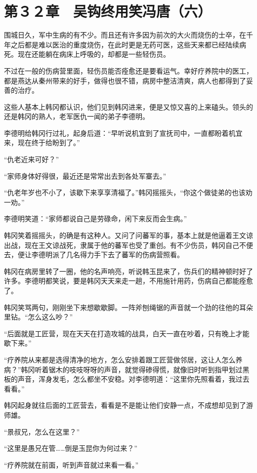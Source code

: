 \section{第３２章　吴钩终用笑冯唐（六）}

围城日久，军中生病的有不少。而且还有许多因为前次的大火而烧伤的士卒，在千年之后都是难以医治的重度烧伤，在此时更是无药可医，这些天来都已经陆续病死。现在还能躺在病床上呼吸的，却都是一些轻伤员。

不过在一般的伤病营里面，轻伤员能否痊愈还是要看运气。幸好疗养院中的医工，都是燕达从秦州带来的好手，做得也很不错，病房中整洁清爽，病人也都得到了妥善的治疗。

这些人基本上韩冈都认识，他们见到韩冈进来，便是又惊又喜的上来磕头。领头的还是韩冈的熟人，老军医仇一闻的弟子李德明。

李德明给韩冈行过礼，起身后道：“早听说机宜到了宣抚司中，一直都盼着机宜来，现在终于给盼到了。”

“仇老近来可好？”

“家师身体好得很，最近还是常常出去到各处军寨去。”

“仇老年岁也不小了，该歇下来享享清福了。”韩冈摇摇头，“你这个做徒弟的也该劝一劝。”

李德明笑道：“家师都说自己是劳碌命，闲下来反而会生病。”

韩冈笑着摇摇头，的确是有这种人。又问了问蕃军的事，基本上就是他逼着王文谅出战，现在王文谅战死，隶属于他的蕃军也受了重创。有不少伤员，韩冈自己不便去，便让李德明派了几名得力手下去了蕃军的伤病营照看。

韩冈在病房里转了一圈，他的名声响亮，听说韩玉昆来了，伤兵们的精神顿时好了许多。李德明都笑说，要是韩冈天天来走一趟，不用施针用药，伤病自己都能痊愈了。

韩冈笑骂两句，刚刚坐下来想歇歇脚。一阵斧刨绳锯的声音就一个劲的往他的耳朵里钻。“怎么这么吵？”

“后面就是工匠营，现在天天在打造攻城的战具，白天一直在吵着，只有晚上才能歇下来。”

“疗养院从来都是选得清净的地方，怎么安排着跟工匠营做邻居，这让人怎么养病？”韩冈听着锯木的吱吱呀呀的声音，就觉得碜得慌，就像旧时听到指甲划过黑板的声音，浑身发毛，怎么都坐不安稳。对李德明道：“这里你先照看着，我过去看看。”

韩冈起身就往后面的工匠营去，看看是不是能让他们安静一点，不成想却见到了游师雄。

“景叔兄，怎么在这里？”

“这里是愚兄在管……倒是玉昆你为何过来？”

“疗养院就在前面，听到声音就过来看一看。”

